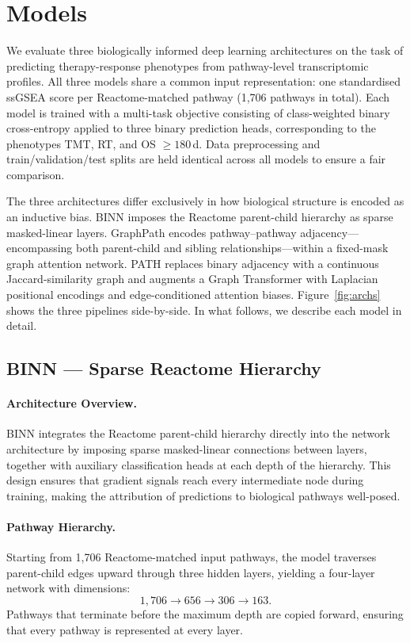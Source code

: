 \section{Models}\label{sec:methods}

We evaluate three biologically informed deep learning architectures on the task of predicting therapy-response phenotypes from pathway-level transcriptomic profiles. All three models share a common input representation: one standardised ssGSEA score per Reactome-matched pathway (1,706 pathways in total). Each model is trained with a multi-task objective consisting of class-weighted binary cross-entropy applied to three binary prediction heads, corresponding to the phenotypes TMT, RT, and OS $\geq 180$\,d. Data preprocessing and train/validation/test splits are held identical across all models to ensure a fair comparison.

The three architectures differ exclusively in how biological structure is encoded as an inductive bias. BINN imposes the Reactome parent-child hierarchy as sparse masked-linear layers. GraphPath encodes pathway--pathway adjacency---encompassing both parent-child and sibling relationships---within a fixed-mask graph attention network. PATH replaces binary adjacency with a continuous Jaccard-similarity graph and augments a Graph Transformer with Laplacian positional encodings and edge-conditioned attention biases. Figure~\ref{fig:archs} shows the three pipelines side-by-side. In what follows, we describe each model in detail.

\subsection{BINN --- Sparse Reactome Hierarchy}

\paragraph{Architecture Overview.}
BINN integrates the Reactome parent-child hierarchy directly into the network architecture by imposing sparse masked-linear connections between layers, together with auxiliary classification heads at each depth of the hierarchy. This design ensures that gradient signals reach every intermediate node during training, making the attribution of predictions to biological pathways well-posed.

\paragraph{Pathway Hierarchy.}
Starting from 1,706 Reactome-matched input pathways, the model traverses parent-child edges upward through three hidden layers, yielding a four-layer network with dimensions:
\begin{equation}
1{,}706 \to 656 \to 306 \to 163.
\end{equation}
Pathways that terminate before the maximum depth are copied forward, ensuring that every pathway is represented at every layer.


